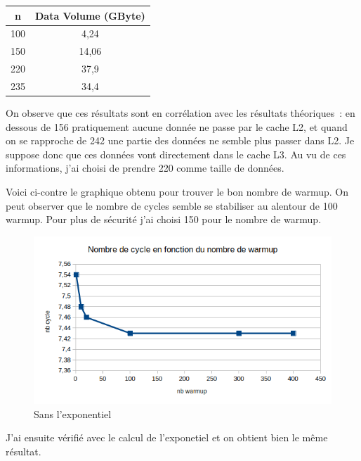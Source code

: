 \documentclass[12pt,a4paper]{article}
\begin{document}
\begin{table}[!h]
    \centering
    \begin{tabular}{|c|c|}
        \hline
        n & Data Volume (GByte) \\
        \hline
        100 & 4,24 \\
        \hline
        150 & 14,06 \\
        \hline
        220 & 37,9 \\
        \hline
        235 & 34,4 \\
        \hline
    \end{tabular}
\end{table}

On observe que ces résultats sont en corrélation avec les résultats théoriques :
en dessous de 156 pratiquement aucune donnée ne passe par le cache L2, et 
quand on se rapproche de 242 une partie des données ne semble plus passer 
dans L2. Je suppose donc que ces données vont directement dans le cache L3.
Au vu de ces informations, j'ai choisi de prendre 220 comme taille de 
données.

Voici ci-contre le graphique obtenu pour trouver le bon nombre de warmup. On
peut observer que le nombre de cycles semble se stabiliser au alentour de 100
warmup. Pour plus de sécurité j'ai choisi 150 pour le nombre de warmup.

\begin{figure}[!h]
    \includegraphics[scale=0.8]{figures/L2/L2warmup.png}
    \caption{Sans l'exponentiel}
\end{figure}

J'ai ensuite vérifié avec le calcul de l'exponetiel et on obtient bien le 
même résultat. 
\end{document}
